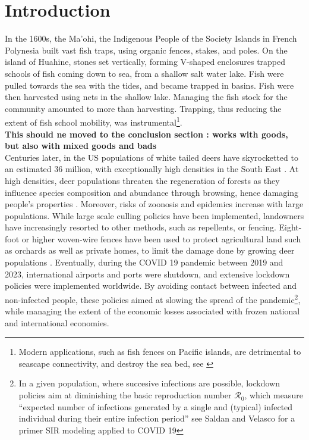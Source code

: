\newpage


\section{Introduction}

In the 1600s, the Ma'ohi,  the Indigenous People of the Society Islands in French Polynesia \citep{oliver2019} built vast fish traps, using organic fences, stakes, and poles. On the island of Huahine, stones set vertically, forming V-shaped enclosures trapped schools of fish coming down to sea, from a shallow salt water lake. Fish were pulled towards the sea with the tides, and became trapped in basins. Fish were then harvested using nets in the shallow lake. Managing the fish stock for the community amounted to more than harvesting.  Trapping, thus reducing the extent of fish school mobility, was instrumental\footnote{Modern applications, such as fish fences on Pacific islands, are detrimental to seascape connectivity, and destroy the sea bed, see \cite{exton_artisanal_2019}}.
\\
\textbf{This should ne moved to the conclusion section : works with goods, but also with mixed goods and bads}
\\
Centuries later, in the US populations of white tailed deers have skyrocketted to an estimated 36 million, with exceptionally high densities in the South East \citep{hanberry_regaining_2020}. 
At high densities, deer populations threaten the regeneration of forests as they influence species composition and abundance through browsing, hence damaging people's properties \citep{hanberry_does_2019}. Moreover, risks of zoonosis and epidemics increase with large populations. While large scale culling policies have been implemented, landowners have increasingly resorted to other methods, such as repellents, or fencing. Eight-foot or higher woven-wire fences have been used to protect agricultural land such as orchards as well as private homes, to limit the damage done by growing deer populations \citep{caslick_economic_1979}.
 Eventually, during the COVID 19 pandemic between 2019 and 2023, international airports and ports were shutdown, and extensive lockdown policies were implemented worldwide. By avoiding contact between infected and non-infected people, these policies aimed at slowing the spread of the pandemic\footnote{In a given population, where succesive infections are possible, lockdown policies aim at diminishing the basic reproduction number $\mathcal{R}_0$, which measure ``expected number of infections generated by a single and (typical) infected individual during their entire infection period'' see Saldan and Velasco for a primer SIR modeling applied to COVID 19}, while managing the extent of the economic losses associated with frozen national and international economies. 

